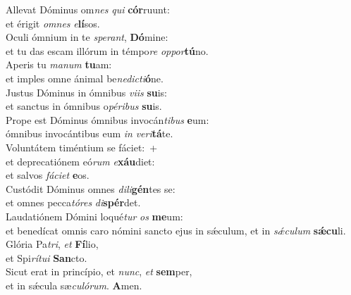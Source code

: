 \evenverse Allevat Dóminus om\textit{nes} \textit{qui} \textbf{cór}ruunt:~\*\\
\evenverse et érigit \textit{om}\textit{nes} \textit{e}\textbf{lí}sos.\\
\oddverse Oculi ómnium in te \textit{spe}\textit{rant}, \textbf{Dó}mine:~\*\\
\oddverse et tu das escam illórum in témpo\textit{re} \textit{op}\textit{por}\textbf{tú}no.\\
\evenverse Aperis tu \textit{ma}\textit{num} \textbf{tu}am:~\*\\
\evenverse et imples omne ánimal be\textit{ne}\textit{di}\textit{cti}\textbf{ó}ne.\\
\oddverse Justus Dóminus in ómnibus \textit{vi}\textit{is} \textbf{su}is:~\*\\
\oddverse et sanctus in ómnibus o\textit{pé}\textit{ri}\textit{bus} \textbf{su}is.\\
\evenverse Prope est Dóminus ómnibus invocán\textit{ti}\textit{bus} \textbf{e}um:~\*\\
\evenverse ómnibus invocántibus eum \textit{in} \textit{ve}\textit{ri}\textbf{tá}te.\\
\oddverse Voluntátem timéntium se fáciet:~+\\
\oddverse  et deprecatiónem eó\textit{rum} \textit{e}\textbf{xáu}diet:~\*\\
\oddverse et salvos \textit{fá}\textit{ci}\textit{et} \textbf{e}os.\\
\evenverse Custódit Dóminus omnes \textit{di}\textit{li}\textbf{gén}tes se:~\*\\
\evenverse et omnes pecca\textit{tó}\textit{res} \textit{di}\textbf{spér}det.\\
\oddverse Laudatiónem Dómini loqué\textit{tur} \textit{os} \textbf{me}um:~\*\\
\oddverse et benedícat omnis caro nómini sancto ejus in sǽculum, et in \textit{sǽ}\textit{cu}\textit{lum} \textbf{sǽ}\textbf{cu}li.\\
\evenverse Glória Pa\textit{tri}, \textit{et} \textbf{Fí}lio,~\*\\
\evenverse et Spi\textit{rí}\textit{tu}\textit{i} \textbf{San}cto.\\
\oddverse Sicut erat in princípio, et \textit{nunc}, \textit{et} \textbf{sem}per,~\*\\
\oddverse et in sǽcula sæ\textit{cu}\textit{ló}\textit{rum}. \textbf{A}men.\\
